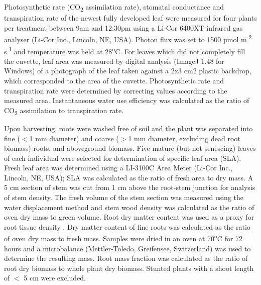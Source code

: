 \documentclass[12pt,a4paper]{memoir}
\begin{document}
Photosynthetic rate (CO\textsubscript{2} assimilation rate), stomatal conductance and transpiration rate of the newest fully developed leaf were measured for four plants per treatment between 9am and 12:30pm using a Li-Cor 6400XT infrared gas analyser (Li-Cor Inc., Lincoln, NE, USA). Photon flux was set to 1500 µmol m\textsuperscript{-2} s\textsuperscript{-1} and temperature was held at 28\textsuperscript{o}C. For leaves which did not completely fill the cuvette, leaf area was measured by digital analysis (ImageJ 1.48 for Windows) of a photograph of the leaf taken against a 2x3 cm2 plastic backdrop, which corresponded to the area of the cuvette. Photosynthetic rate and transpiration rate were determined by correcting values according to the measured area. Instantaneous water use efficiency was calculated as the ratio of CO\textsubscript{2} assimilation to transpiration rate.

Upon harvesting, roots were washed free of soil and the plant was separated into fine ($<$1 mm diameter) and coarse ($>$1 mm diameter, excluding dead root biomass) roots, and aboveground biomass. Five mature (but not senescing) leaves of each individual were selected for determination of specific leaf area (SLA). Fresh leaf area was determined using a LI-3100C Area Meter (Li-Cor Inc., Lincoln, NE, USA); SLA was calculated as the ratio of fresh area to dry mass.  A 5 cm section of stem was cut from 1 cm above the root-stem junction for analysis of stem density. The fresh volume of the stem section was measured using the water displacement method and stem wood density was calculated as the ratio of oven dry mass to green volume. Root dry matter content was used as a proxy for root tissue density \citep{Birouste2013}. Dry matter content of fine roots was calculated as the ratio of oven dry mass to fresh mass. Samples were dried in an oven at 70\textsuperscript{o}C for 72 hours and a microbalance (Mettler-Toledo, Greifensee, Switzerland) was used to determine the resulting mass. Root mass fraction was calculated as the ratio of root dry biomass to whole plant dry biomass. Stunted plants with a shoot length of $<$ 5 cm were excluded.
\end{document}
